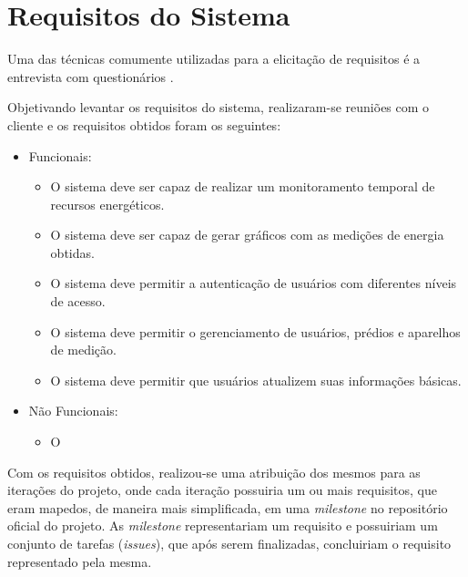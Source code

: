 \chapter{Requisitos do Sistema}
Uma das técnicas comumente utilizadas para a elicitação de requisitos é a entrevista com questionários \cite{goguen_1994}.

Objetivando levantar os requisitos do sistema, realizaram-se reuniões com o
cliente e os requisitos obtidos foram os seguintes:

\begin{itemize}
    \item Funcionais:
    \begin{itemize}
        \item O sistema deve ser capaz de realizar um monitoramento temporal de recursos energéticos.
        \item O sistema deve ser capaz de gerar gráficos com as medições de energia obtidas.
        \item O sistema deve permitir a autenticação de usuários com diferentes níveis de acesso.
        \item O sistema deve permitir o gerenciamento de usuários, prédios e aparelhos de medição.
        \item O sistema deve permitir que usuários atualizem suas informações básicas.
    \end{itemize}
    \item Não Funcionais:
    \begin{itemize}
        \item O
    \end{itemize}
\end{itemize}

Com os requisitos obtidos, realizou-se uma atribuição dos mesmos para
as iterações do projeto, onde cada iteração possuiria um ou mais requisitos,
que eram mapedos, de maneira mais simplificada, em uma \textit{milestone} no repositório oficial do projeto.
As \textit{milestone} representariam um requisito e possuiriam um conjunto
de tarefas (\textit{issues}), que após serem finalizadas, concluiriam
o requisito representado pela mesma.